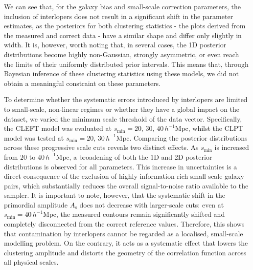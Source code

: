 \documentclass[12pt,a4paper,oneside]{report}
\begin{document}
We can see that, for the galaxy bias and small-scale correction parameters, the inclusion of interlopers does not result in a significant shift in the parameter estimates, as the posteriors for both clustering statistics - the plots derived from the measured and correct data - have a similar shape and differ only slightly in width. It is, however, worth noting that, in several cases, the 1D posterior distributions become highly non-Gaussian, strongly asymmetric, or even reach the limits of their uniformly distributed prior intervals. This means that, through Bayesian inference of these clustering statistics using these models, we did not obtain a meaningful constraint on these parameters.

To determine whether the systematic errors introduced by interlopers are limited to small-scale, non-linear regimes or whether they have a global impact on the dataset, we varied the minimum scale threshold of the data vector. Specifically, the CLEFT model was evaluated at $s_{\mathrm{min}} = 20, \,30, \,40 \, h^{-1}\mathrm{Mpc}$, whilst the CLPT model was tested at $s_{\mathrm{min}} = 20, \,30 \, h^{-1}\mathrm{Mpc}$.
Comparing the posterior distributions across these progressive scale cuts reveals two distinct effects. As $s_{\mathrm{min}}$ is increased from $20$ to $40 \, h^{-1}\mathrm{Mpc}$, a broadening of both the 1D and 2D posterior distributions is observed for all parameters. This increase in uncertainties is a direct consequence of the exclusion of highly information-rich small-scale galaxy pairs, which substantially reduces the overall signal-to-noise ratio available to the sampler. It is important to note, however, that the systematic shift in the primordial amplitude $A_\mathrm{s}$ does not decrease with larger-scale cuts: even at $s_{\mathrm{min}} = 40 \, h^{-1}\mathrm{Mpc}$, the measured contours remain significantly shifted and completely disconnected from the correct reference values. Therefore, this shows that contamination by interlopers cannot be regarded as a localised, small-scale modelling problem. On the contrary, it acts as a systematic effect that lowers the clustering amplitude and distorts the geometry of the correlation function across all physical scales.
\end{document}
